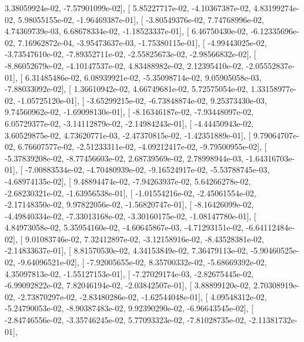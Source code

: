 \documentclass{article}
\begin{document}
          3.38059924e-02,  -7.57901099e-02],
       [  5.85227717e-02,  -4.10367387e-02,   4.83199274e-02,
          5.98055155e-02,  -1.96469387e-01],
       [ -3.80549376e-02,   7.74768996e-02,   4.74369739e-03,
          6.68678334e-02,  -1.18523337e-01],
       [  6.46750430e-02,  -6.12335696e-02,   7.16962872e-04,
         -3.95473637e-03,  -1.75380115e-01],
       [ -4.99443025e-02,  -3.73547610e-02,  -7.89352711e-02,
         -2.55825673e-02,  -2.98566832e-02],
       [ -8.86052679e-02,  -4.10147537e-02,   4.83488982e-02,
          2.12395410e-02,  -2.05552837e-01],
       [  6.31485486e-02,   6.08939921e-02,  -5.35098714e-02,
          9.05905058e-03,  -7.88033092e-02],
       [  1.36610942e-02,   4.66749681e-02,   5.72575054e-02,
          1.33158977e-02,  -1.05725120e-01],
       [ -3.65299215e-02,  -6.73848874e-02,   9.25373430e-03,
          9.74560962e-02,  -1.69098130e-01],
       [ -8.16346187e-02,  -7.93448097e-02,   6.05729377e-02,
         -3.14112879e-02,  -2.14984243e-01],
       [ -4.44450943e-02,   3.60529875e-02,   4.73620771e-03,
         -2.47370815e-02,  -1.42351889e-01],
       [  9.79064707e-02,   6.76607577e-02,  -2.51233311e-02,
         -4.09212417e-02,  -9.79500955e-02],
       [ -5.37839208e-02,  -8.77456603e-02,   2.68739569e-02,
          2.78998944e-03,  -1.64316703e-01],
       [ -7.00883534e-02,  -4.70480939e-02,  -9.16524917e-02,
         -5.53788745e-03,  -4.68974135e-02],
       [  9.48894474e-02,  -7.94263937e-02,   5.64266278e-02,
         -2.68230321e-02,  -1.63956538e-01],
       [ -1.01554216e-02,  -2.45061554e-02,  -2.17148350e-02,
          9.97822056e-02,  -1.56820747e-01],
       [ -8.16426099e-02,  -4.49840334e-02,  -7.33013168e-02,
         -3.30160175e-02,  -1.08147780e-01],
       [  4.84973058e-02,   5.35954160e-02,  -4.60645867e-03,
         -4.71293151e-02,  -6.64112484e-02],
       [  9.01083746e-02,   7.32412897e-02,  -3.12158916e-02,
         -8.43528381e-02,  -2.14833637e-01],
       [  8.81570530e-02,   4.34153849e-02,   7.36479113e-02,
         -5.90460525e-02,  -9.64096521e-02],
       [ -7.92005655e-02,   8.35700332e-02,  -5.68669392e-02,
          4.35097813e-02,  -1.55127153e-01],
       [ -7.27029174e-03,  -2.82675445e-02,  -6.99092822e-02,
          7.82046194e-02,  -2.03842507e-01],
       [  3.88899120e-02,   2.70308919e-02,  -2.73870297e-02,
         -2.83480286e-02,  -1.62544048e-01],
       [  4.09548312e-02,  -5.24790053e-02,  -8.90387483e-02,
          9.92390290e-02,  -6.96643545e-02],
       [ -2.84746556e-02,  -3.35746245e-02,   5.77093323e-02,
         -7.81028735e-02,  -2.11381732e-01],
\end{document}
